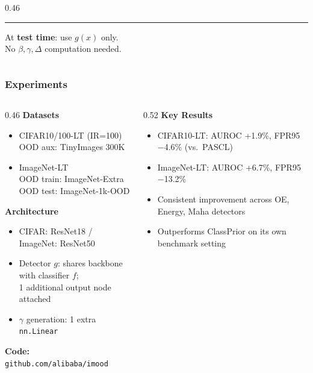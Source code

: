 \documentclass[10pt,aspectratio=169]{beamer}
\begin{document}
\begin{frame}
{\begin{columns}[T]
\begin{column}{0.46\textwidth}
\hrule\vspace{4pt}
{\scriptsize At \textbf{test time}: use $g(x)$ only.\\
No $\beta,\gamma,\Delta$ computation needed.}
\end{column}
\end{columns}
}
\end{frame}

\begin{frame}
\frametitle{Experiments}
{\small
\begin{columns}[T]
\begin{column}{0.46\textwidth}
\textbf{Datasets}
\begin{itemize}\setlength\itemsep{1pt}
  \item CIFAR10/100-LT {\scriptsize (IR=100)}\\
        {\scriptsize OOD aux: TinyImages 300K}
  \item ImageNet-LT\\
        {\scriptsize OOD train: ImageNet-Extra}\\
        {\scriptsize OOD test: ImageNet-1k-OOD}
\end{itemize}
\vspace{4pt}
\textbf{Architecture}
\begin{itemize}\setlength\itemsep{1pt}
  \item CIFAR: ResNet18 / ImageNet: ResNet50
  \item Detector $g$: shares backbone with classifier $f$;\\
        {\scriptsize 1 additional output node attached}
  \item $\gamma$ generation: 1 extra \texttt{nn.Linear}
\end{itemize}
\vspace{2pt}
\textbf{Code:} \texttt{github.com/alibaba/imood}
\end{column}
\begin{column}{0.52\textwidth}
\textbf{Key Results}
{\scriptsize
\begin{itemize}\setlength\itemsep{2pt}
  \item CIFAR10-LT: AUROC +1.9\%, FPR95 $-$4.6\% (vs.\ PASCL)
  \item ImageNet-LT: AUROC +6.7\%, FPR95 $-$13.2\%
  \item Consistent improvement across OE, Energy, Maha detectors
  \item Outperforms ClassPrior on its own benchmark setting
\end{itemize}
}

\end{column}
\end{columns}}
\end{frame}
\end{document}
